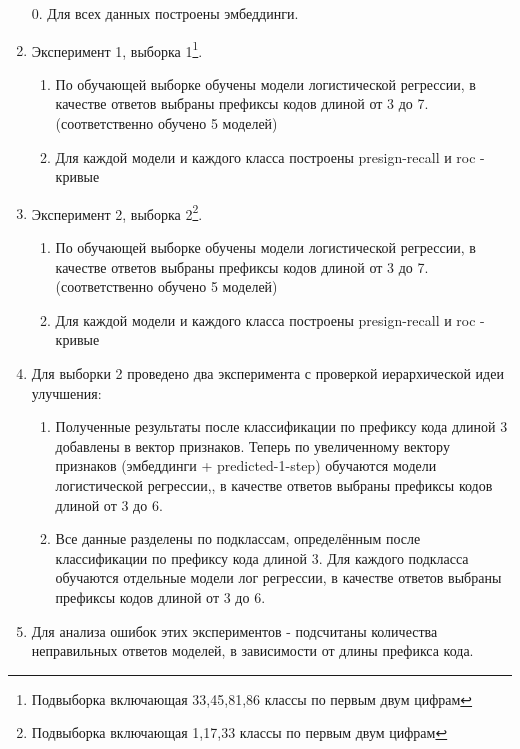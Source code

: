 \documentclass{article}
\begin{document}
\begin{enumerate}
    \item[0.] Для всех данных построены эмбеддинги.
    \item Эксперимент 1, выборка 1\footnote{Подвыборка включающая 33,45,81,86 классы по первым двум цифрам}.
     \begin{enumerate}
        \item По обучающей выборке обучены модели логистической регрессии, в качестве ответов выбраны префиксы кодов длиной от 3 до 7. (соответственно обучено 5 моделей)
        \item Для каждой модели и каждого класса построены presign-recall и roc - кривые
     \end{enumerate}
   
     \item Эксперимент 2, выборка 2\footnote{Подвыборка включающая 1,17,33 классы по первым двум цифрам}.
     \begin{enumerate}
      \item По обучающей выборке обучены модели логистической регрессии, в качестве ответов выбраны префиксы кодов длиной от 3 до 7. (соответственно обучено 5 моделей)
      \item Для каждой модели и каждого класса построены presign-recall и roc - кривые
     \end{enumerate}
    
    \item Для выборки 2 проведено два эксперимента с проверкой иерархической идеи улучшения:
    \begin{enumerate}
        \item Полученные результаты после классификации по префиксу кода длиной 3 добавлены в вектор признаков. Теперь по увеличенному вектору признаков (эмбеддинги + predicted-1-step) обучаются модели логистической регрессии,, в качестве ответов выбраны префиксы кодов длиной от 3 до 6.
        \item Все данные разделены по подклассам, определённым после классификации по префиксу кода длиной 3. Для каждого подкласса обучаются отдельные модели лог регрессии, в качестве ответов выбраны префиксы кодов длиной от 3 до 6.
    \end{enumerate}
    \item Для анализа ошибок этих экспериментов - подсчитаны количества неправильных ответов моделей, в зависимости от длины префикса кода. 
\end{enumerate}
\end{document}
